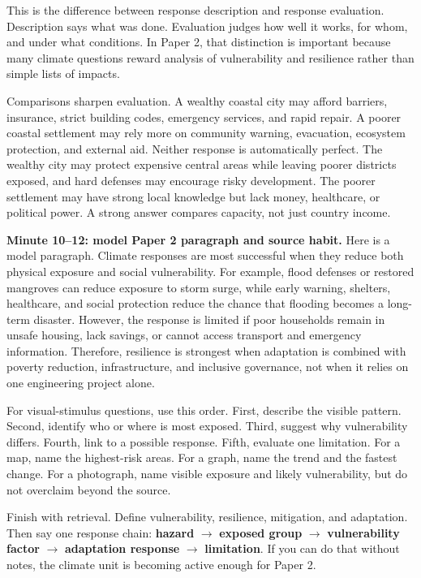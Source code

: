 \documentclass[11pt,a4paper]{article}
\newcommand{\term}[1]{\textcolor{HeadingBlue}{\textbf{#1}}}
\begin{document}
This is the difference between response description and response evaluation.
Description says what was done. Evaluation judges how well it works, for whom,
and under what conditions. In Paper 2, that distinction is important because
many climate questions reward analysis of vulnerability and resilience rather
than simple lists of impacts.

Comparisons sharpen evaluation. A wealthy coastal city may afford barriers,
insurance, strict building codes, emergency services, and rapid repair. A poorer
coastal settlement may rely more on community warning, evacuation, ecosystem
protection, and external aid. Neither response is automatically perfect. The
wealthy city may protect expensive central areas while leaving poorer districts
exposed, and hard defenses may encourage risky development. The poorer
settlement may have strong local knowledge but lack money, healthcare, or
political power. A strong answer compares capacity, not just country income.

\textbf{Minute 10--12: model Paper 2 paragraph and source habit.}
Here is a model paragraph. Climate responses are most successful when they
reduce both physical exposure and social vulnerability. For example, flood
defenses or restored mangroves can reduce exposure to storm surge, while early
warning, shelters, healthcare, and social protection reduce the chance that
flooding becomes a long-term disaster. However, the response is limited if poor
households remain in unsafe housing, lack savings, or cannot access transport
and emergency information. Therefore, resilience is strongest when adaptation is
combined with poverty reduction, infrastructure, and inclusive governance, not
when it relies on one engineering project alone.

For visual-stimulus questions, use this order. First, describe the visible
pattern. Second, identify who or where is most exposed. Third, suggest why
vulnerability differs. Fourth, link to a possible response. Fifth, evaluate one
limitation. For a map, name the highest-risk areas. For a graph, name the trend
and the fastest change. For a photograph, name visible exposure and likely
vulnerability, but do not overclaim beyond the source.

Finish with retrieval. Define vulnerability, resilience, mitigation, and
adaptation. Then say one response chain:
\term{hazard} $\rightarrow$ \term{exposed group} $\rightarrow$
\term{vulnerability factor} $\rightarrow$ \term{adaptation response}
$\rightarrow$ \term{limitation}. If you can do that without notes, the climate
unit is becoming active enough for Paper 2.
\end{document}
